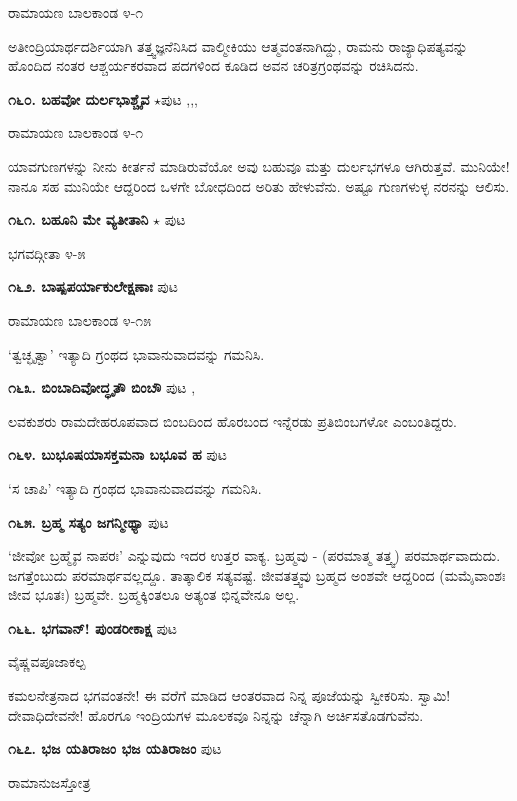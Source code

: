 \hfill ರಾಮಾಯಣ ಬಾಲಕಾಂಡ ೪-೧

ಅತೀಂದ್ರಿಯಾರ್ಥದರ್ಶಿಯಾಗಿ ತತ್ತ್ವಜ್ಞನೆನಿಸಿದ ವಾಲ್ಮೀಕಿಯು ಆತ್ಮವಂತನಾಗಿದ್ದು, ರಾಮನು ರಾಜ್ಯಾಧಿಪತ್ಯವನ್ನು ಹೊಂದಿದ ನಂತರ ಆಶ್ಚರ್ಯಕರವಾದ ಪದಗಳಿಂದ ಕೂಡಿದ ಅವನ ಚರಿತ್ರಗ್ರಂಥವನ್ನು ರಚಿಸಿದನು.

\medskip
\noindent\textbf{೧೬೦. ಬಹವೋ ದುರ್ಲಭಾಶ್ಚೈವ} $\star$\hfill ಪುಟ \pageref{163a},\pageref{194a},\pageref{219a},\pageref{247c}

\hfill ರಾಮಾಯಣ ಬಾಲಕಾಂಡ ೪-೧

ಯಾವಗುಣಗಳನ್ನು ನೀನು ಕೀರ್ತನೆ ಮಾಡಿರುವೆಯೋ ಅವು ಬಹುವೂ ಮತ್ತು ದುರ್ಲಭಗಳೂ ಆಗಿರುತ್ತವೆ. ಮುನಿಯೇ! ನಾನೂ ಸಹ ಮುನಿಯೇ ಆದ್ದರಿಂದ ಒಳಗೇ ಬೋಧದಿಂದ ಅರಿತು ಹೇಳುವೆನು. ಅಷ್ಟೂ ಗುಣಗಳುಳ್ಳ ನರನನ್ನು ಆಲಿಸು.

\medskip
\noindent\textbf{೧೬೧. ಬಹೂನಿ ಮೇ ವ್ಯತೀತಾನಿ} $\star$ \hfill ಪುಟ \pageref{91a}

\hfill ಭಗವದ್ಗೀತಾ ೪-೫

\medskip
\noindent\textbf{೧೬೨. ಬಾಷ್ಪಪರ್ಯಾಕುಲೇಕ್ಷಣಾಃ} \hfill ಪುಟ \pageref{211b}

\hfill ರಾಮಾಯಣ ಬಾಲಕಾಂಡ ೪-೧೫

`ತ್ವಚ್ಛೃತ್ವಾ' ಇತ್ಯಾದಿ ಗ್ರಂಥದ ಭಾವಾನುವಾದವನ್ನು ಗಮನಿಸಿ.

\medskip
\noindent\textbf{೧೬೩. ಬಿಂಬಾದಿವೋದ್ಧೃತೌ ಬಿಂಬೌ} \hfill ಪುಟ \pageref{167b},\pageref{228a}

ಲವಕುಶರು ರಾಮದೇಹರೂಪವಾದ ಬಿಂಬದಿಂದ ಹೊರಬಂದ ಇನ್ನೆರಡು ಪ್ರತಿಬಿಂಬಗಳೋ ಎಂಬಂತಿದ್ದರು.

\medskip
\noindent\textbf{೧೬೪. ಬುಭೂಷಯಾಸಕ್ತಮನಾ ಬಭೂವ ಹ} \hfill ಪುಟ \pageref{211c}

`ಸ ಚಾಪಿ' ಇತ್ಯಾದಿ ಗ್ರಂಥದ ಭಾವಾನುವಾದವನ್ನು ಗಮನಿಸಿ.

\medskip
\noindent\textbf{೧೬೫. ಬ್ರಹ್ಮ ಸತ್ಯಂ ಜಗನ್ಮೀಥ್ಯಾ} \hfill ಪುಟ \pageref{54a}

\hfill `ಜೀವೋ ಬ್ರಹ್ಮೈವ ನಾಪರಃ' ಎನ್ನುವುದು ಇದರ ಉತ್ತರ ವಾಕ್ಯ. ಬ್ರಹ್ಮವು - (ಪರಮಾತ್ಮ ತತ್ತ್ವ) ಪರಮಾರ್ಥವಾದುದು. ಜಗತ್ತೆಂಬುದು ಪರಮಾರ್ಥವಲ್ಲದ್ದೂ. ತಾತ್ಕಾಲಿಕ ಸತ್ಯವಷ್ಟೆ. ಜೀವತತ್ತ್ವವು ಬ್ರಹ್ಮದ ಅಂಶವೇ ಆದ್ದರಿಂದ (ಮಮೈವಾಂಶಃ ಜೀವ ಭೂತಃ) ಬ್ರಹ್ಮವೇ. ಬ್ರಹ್ಮಕ್ಕಿಂತಲೂ ಅತ್ಯಂತ ಭಿನ್ನವೇನೂ ಅಲ್ಲ.

\medskip
\noindent\textbf{೧೬೬. ಭಗವಾನ್! ಪುಂಡರೀಕಾಕ್ಷ} \hfill ಪುಟ \pageref{115a}

\hfill ವೈಷ್ಣವಪೂಜಾಕಲ್ಪ

ಕಮಲನೇತ್ರನಾದ ಭಗವಂತನೇ! ಈ ವರೆಗೆ ಮಾಡಿದ ಆಂತರವಾದ ನಿನ್ನ ಪೂಜೆಯನ್ನು ಸ್ವೀಕರಿಸು. ಸ್ವಾಮಿ! ದೇವಾಧಿದೇವನೇ! ಹೊರಗೂ ಇಂದ್ರಿಯಗಳ ಮೂಲಕವೂ ನಿನ್ನನ್ನು ಚೆನ್ನಾಗಿ ಅರ್ಚಿಸತೊಡಗುವೆನು.

\medskip
\noindent\textbf{೧೬೭. ಭಜ ಯತಿರಾಜಂ ಭಜ ಯತಿರಾಜಂ} \hfill ಪುಟ \pageref{46}

\hfill ರಾಮಾನುಜಸ್ತೋತ್ರ

